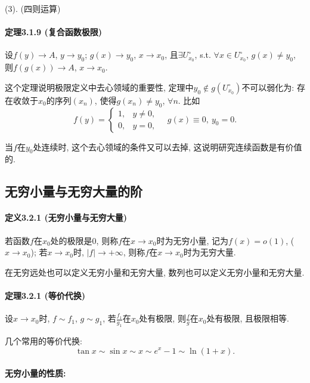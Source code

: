 (3). (四则运算)

\paragraph{定理3.1.9 (复合函数极限)}

设$f(y)\to A$, $y\to y_{0}$; $g(x)\to y_{0}$, $x\to x_{0}$, 且$\exists U_{x_{0}}^{\circ}$,
s.t. $\forall x\in U_{x_{0}}^{\circ}$, $g(x)\ne y_{0}$, 则$f(g(x))\to A$,
$x\to x_{0}$.

这个定理说明极限定义中去心领域的重要性, 定理中$y_{0}\not\in g(U_{x_{0}}^{\circ})$不可以弱化为:
存在收敛于$x_{0}$的序列$\left(x_{n}\right)$, 使得$g(x_{n})\ne y_{0}$, $\forall n$.
比如
\[
f(y)=\begin{cases}
	1, & y\ne0,\\
	0, & y=0,
\end{cases}\quad g(x)\equiv0,\ y_{0}=0.
\]

当$f$在$y_{0}$处连续时, 这个去心领域的条件又可以去掉, 这说明研究连续函数是有价值的.

\subsection{无穷小量与无穷大量的阶}

\paragraph{定义3.2.1 (无穷小量与无穷大量)}

若函数$f$在$x_{0}$处的极限是$0$, 则称$f$在$x\to x_{0}$时为无穷小量, 记为$f(x)=o(1)$,
($x\to x_{0}$); 若$x\to x_{0}$时, $\left|f\right|\to+\infty$, 则称$f$在$x\to x_{0}$时为无穷大量.

在无穷远处也可以定义无穷小量和无穷大量, 数列也可以定义无穷小量和无穷大量.

\paragraph{定理3.2.1 (等价代换)}

设$x\to x_{0}$时, $f\sim f_{1}$, $g\sim g_{1}$, 若$\frac{f_{1}}{g_{1}}$在$x_{0}$处有极限,
则$\frac{f}{g}$在$x_{0}$处有极限, 且极限相等.

几个常用的等价代换:
\[
\tan x\sim\sin x\sim x\sim e^{x}-1\sim\ln(1+x).
\]


\paragraph{无穷小量的性质:}

